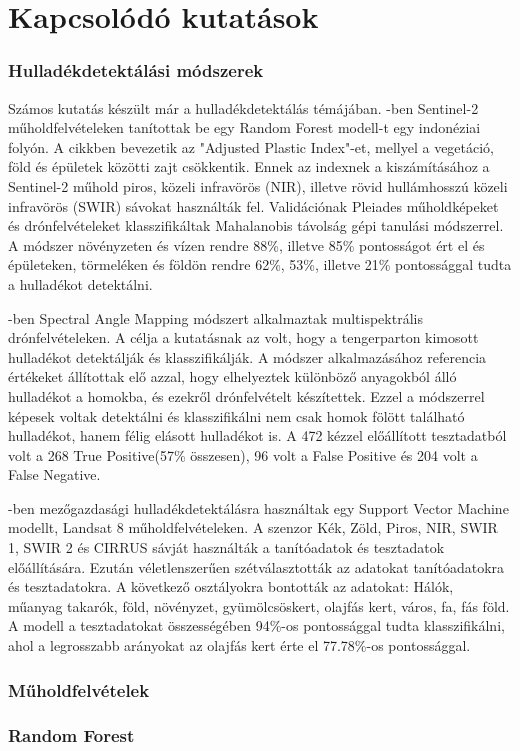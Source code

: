 \chapter{Kapcsolódó kutatások}
\label{ch:related_research}

\subsection{Hulladékdetektálási módszerek}

Számos kutatás készült már a hulladékdetektálás témájában. \cite{sakti2023}-ben Sentinel-2 műholdfelvételeken tanítottak be egy Random Forest modell-t egy indonéziai folyón. A cikkben bevezetik az "Adjusted Plastic Index"-et, mellyel a vegetáció, föld és épületek közötti zajt csökkentik. Ennek az indexnek a kiszámításához a Sentinel-2 műhold piros, közeli infravörös (NIR), illetve rövid hullámhosszú közeli infravörös (SWIR) sávokat használták fel. Validációnak Pleiades műholdképeket és drónfelvételeket klasszifikáltak Mahalanobis távolság gépi tanulási módszerrel. A módszer növényzeten és vízen rendre 88\%, illetve 85\% pontosságot ért el és épületeken, törmeléken és földön rendre 62\%, 53\%, illetve 21\% pontossággal tudta a hulladékot detektálni.

\cite{goncalves2022}-ben Spectral Angle Mapping módszert alkalmaztak multispektrális drónfelvételeken. A célja a kutatásnak az volt, hogy a tengerparton kimosott hulladékot detektálják és klasszifikálják. A módszer alkalmazásához referencia értékeket állítottak elő azzal, hogy elhelyeztek különböző anyagokból álló hulladékot a homokba, és ezekről drónfelvételt készítettek. Ezzel a módszerrel képesek voltak detektálni és klasszifikálni nem csak homok fölött található hulladékot, hanem félig elásott hulladékot is. A 472 kézzel előállított tesztadatból volt a 268 True Positive(57\% összesen), 96 volt a False Positive és 204 volt a False Negative.

\cite{lanorte2017}-ben mezőgazdasági hulladékdetektálásra használtak egy Support Vector Machine modellt, Landsat 8 műholdfelvételeken. A szenzor Kék, Zöld, Piros, NIR, SWIR 1, SWIR 2 és CIRRUS sávját használták a tanítóadatok és tesztadatok előállítására. Ezután véletlenszerűen szétválasztották az adatokat tanítóadatokra és tesztadatokra. A következő osztályokra bontották az adatokat: Hálók, műanyag takarók, föld, növényzet, gyümölcsöskert, olajfás kert, város, fa, fás föld. A modell a tesztadatokat összességében 94\%-os pontossággal tudta klasszifikálni, ahol a legrosszabb arányokat az olajfás kert érte el 77.78\%-os pontossággal.

\subsection{Műholdfelvételek}

\subsection{Random Forest}

